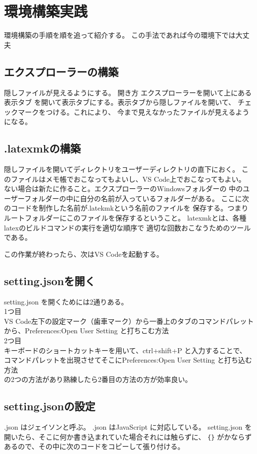 \documentclass{ltjsarticle}
\begin{document}
\section{環境構築実践}
環境構築の手順を順を追って紹介する。
この手法であれば今の環境下では大丈夫
\subsection{エクスプローラーの構築}
隠しファイルが見えるようにする。
開き方 エクスプローラーを開いて上にある表示タブ
を開いて表示タブにする。表示タブから隠しファイルを開いて、
チェックマークをつける。これにより、
今まで見えなかったファイルが見えるようになる。

\subsection{.latexmkの構築} %

\label{sub:.latexmkの構築}
隠しファイルを開いてディレクトリをユーザーディレクトリの直下におく。
このファイルはメモ帳でおこなってもよいし、VS Code上でおこなってもよい。
ない場合は新たに作ること。エクスプローラーのWindowsフォルダーの
中のユーザーフォルダーの中に自分の名前が入っているフォルダーがある。
ここに次のコードを制作した名前が.latekmkという名前のファイルを
保存する。つまりルートフォルダーにこのファイルを保存するということ。
latexmkとは、各種latexのビルドコマンドの実行を適切な順序で
適切な回数おこなうためのツールである。


この作業が終わったら、次はVS Codeを起動する。
\subsection{setting.jsonを開く}
setting.json を開くためには2通りある。\\
1つ目\\
VS Code左下の設定マーク（歯車マーク）から一番上のタブのコマンドパレット
から、Preferences:Open User Setting と打ちこむ方法\\
2つ目\\
キーボードのショートカットキーを用いて、ctrl+shift+P と入力することで、
コマンドパレットを出現させてそこにPreferences:Open User Setting
と打ち込む方法\\
の2つの方法があり熟練したら2番目の方法の方が効率良い。
\subsection{setting.jsonの設定}
.json はジェイソンと呼ぶ。
.json はJavaScript に対応している。
setting.json を開いたら、そこに何か書き込まれていた場合それには触らずに、
\verb|{}|
がかならずあるので、その中に次のコードをコピーして張り付ける。
\end{document}
